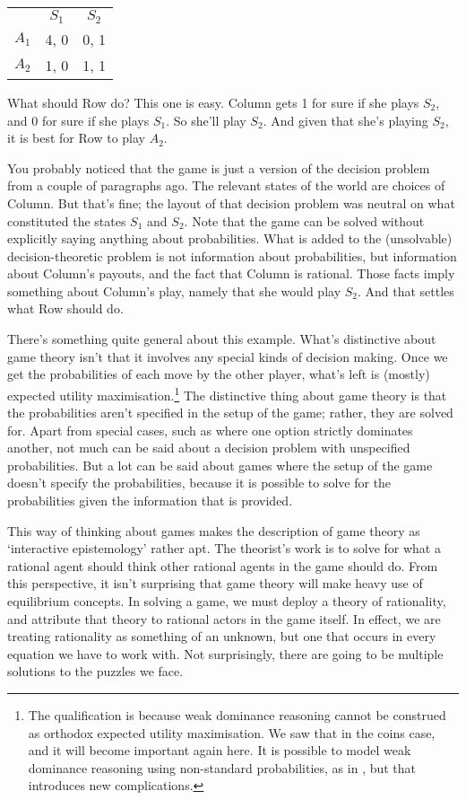 \documentclass[11pt,]{book}
\let\rmarkdownfootnote\footnote%
\def\footnote{\protect\rmarkdownfootnote}
\def\toprule{}
\def\bottomrule{}
\begin{document}
\begin{longtable}[]{@{}lcc@{}}
\toprule
\endhead
& \(S_1\) & \(S_2\)\tabularnewline
\(A_1\) & 4, 0 & 0, 1\tabularnewline
\(A_2\) & 1, 0 & 1, 1\tabularnewline
\bottomrule
\end{longtable}

What should Row do? This one is easy. Column gets 1 for sure if she plays \(S_2\), and 0 for sure if she plays \(S_1\). So she'll play \(S_2\). And given that she's playing \(S_2\), it is best for Row to play \(A_2\).

You probably noticed that the game is just a version of the decision problem from a couple of paragraphs ago. The relevant states of the world are choices of Column. But that's fine; the layout of that decision problem was neutral on what constituted the states \(S_1\) and \(S_2\). Note that the game can be solved without explicitly saying anything about probabilities. What is added to the (unsolvable) decision-theoretic problem is not information about probabilities, but information about Column's payouts, and the fact that Column is rational. Those facts imply something about Column's play, namely that she would play \(S_2\). And that settles what Row should do.

There's something quite general about this example. What's distinctive about game theory isn't that it involves any special kinds of decision making. Once we get the probabilities of each move by the other player, what's left is (mostly) expected utility maximisation.\footnote{The qualification is because weak dominance reasoning cannot be construed as orthodox expected utility maximisation. We saw that in the coins case, and it will become important again here. It is possible to model weak dominance reasoning using non-standard probabilities, as in \citet{Brandenburger2008}, but that introduces new complications.} The distinctive thing about game theory is that the probabilities aren't specified in the setup of the game; rather, they are solved for. Apart from special cases, such as where one option strictly dominates another, not much can be said about a decision problem with unspecified probabilities. But a lot can be said about games where the setup of the game doesn't specify the probabilities, because it is possible to solve for the probabilities given the information that is provided.

This way of thinking about games makes the description of game theory as `interactive epistemology' \citep{Aumann1999} rather apt. The theorist's work is to solve for what a rational agent should think other rational agents in the game should do. From this perspective, it isn't surprising that game theory will make heavy use of equilibrium concepts. In solving a game, we must deploy a theory of rationality, and attribute that theory to rational actors in the game itself. In effect, we are treating rationality as something of an unknown, but one that occurs in every equation we have to work with. Not surprisingly, there are going to be multiple solutions to the puzzles we face.
\end{document}
